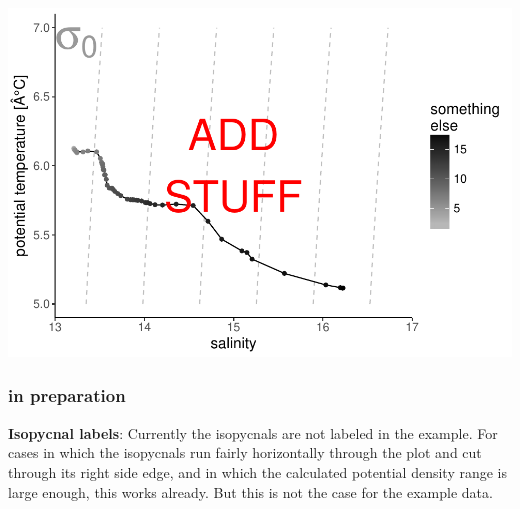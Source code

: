\documentclass[]{article}
\newenvironment{Shaded}{\begin{snugshade}}{\end{snugshade}}
\newcommand{\KeywordTok}[1]{\textcolor[rgb]{0.13,0.29,0.53}{\textbf{#1}}}
\newcommand{\DataTypeTok}[1]{\textcolor[rgb]{0.13,0.29,0.53}{#1}}
\newcommand{\DecValTok}[1]{\textcolor[rgb]{0.00,0.00,0.81}{#1}}
\newcommand{\CharTok}[1]{\textcolor[rgb]{0.31,0.60,0.02}{#1}}
\newcommand{\StringTok}[1]{\textcolor[rgb]{0.31,0.60,0.02}{#1}}
\newcommand{\OperatorTok}[1]{\textcolor[rgb]{0.81,0.36,0.00}{\textbf{#1}}}
\newcommand{\NormalTok}[1]{#1}
\begin{document}
\begin{Shaded}
\end{Shaded}

\includegraphics{README_files/figure-latex/extenden_plot-1.pdf}

\subsubsection{in preparation}\label{in-preparation}

\textbf{Isopycnal labels}: Currently the isopycnals are not labeled in
the example. For cases in which the isopycnals run fairly horizontally
through the plot and cut through its right side edge, and in which the
calculated potential density range is large enough, this works already.
But this is not the case for the example data.
\end{document}
